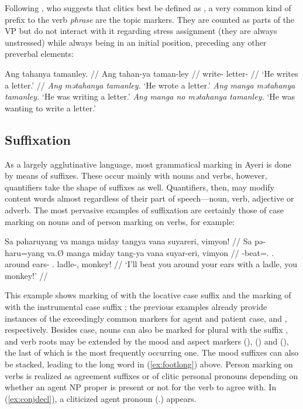 Following \citet{klavans1985}, who suggests that clitics best be defined as 
, a very common 
kind of prefix to the verb \emph{phrase} are the topic markers. They are counted 
as parts of the VP but do not interact with it regarding stress assignment (they 
are always unstressed) while always being in an initial position, preceding any 
other preverbal elements:

\pex
	\a\begingl
		\gla Ang tahanya tamanley. //
		\glb Ang tahan-ya taman-ley //
		\glc \AgtT{} write-\TsgM{} letter-\PargI{} //
		\glft `He writes a letter.' //
	\endgl
	\a \textit{Ang mətahanya tamanley.} `He wrote a letter.'
	\a \textit{Ang manga mətahanya tamanley.} `He was writing a letter.'
	\a \textit{Ang manga no mətahanya tamanley.} `He was wanting to write a 
		letter.'
\xe



\subsection{Suffixation}

As a largely agglutinative language, most grammatical marking in Ayeri is done 
by means of suffixes. These occur mainly with nouns and verbs, however, 
quantifiers take the shape of suffixes as well. Quantifiers, then, may modify 
content words almost regardless of their part of speech---noun, verb, adjective 
or adverb. The most pervasive examples of suffixation are certainly those of 
case marking on nouns and of person marking on verbs, for example:

\ex\label{ex:conjdecl}\begingl
	\gla Sa pəharuyang va manga miday tangya vana suyareri, vimyon! //
	\glb Sa pə-haru=yang va.Ø manga miday tang-ya vana suyar-eri, vimyon //
	\glc \PatT{} \NFut{}-beat=\Fsg{}.\Aarg{} \Ssg{}.\Top{} \Dyn{} around 
		ears-\Loc{} \Ssg{}.\Gen{} ladle-\Ins{}, monkey! //
	\glft `I'll beat you around your ears with a ladle, you monkey!' //
\endgl\xe

This example shows marking of  with the locative case 
suffix  and the marking of  with the 
instrumental case suffix ; the previous examples already 
provide instances of the exceedingly common markers for agent and patient 
case,  and , respectively. Besides case, nouns 
can also be marked for plural with the suffix , and verb roots 
may be extended by the mood and aspect markers  (\Irr{}), 
 (\Hab{}) and  (\Neg{}), the last of which is 
the most frequently occurring one. The mood suffixes can also be stacked, 
leading to the long word in (\ref{ex:footlong}) above. Person marking on verbs 
is realized as agreement suffixes or of clitic personal pronouns depending on 
whether an agent NP proper is present or not for the verb to agree with. In 
(\ref{ex:conjdecl}), a cliticized agent pronoun  
(\TsgM{}.\Aarg{}) appears.

